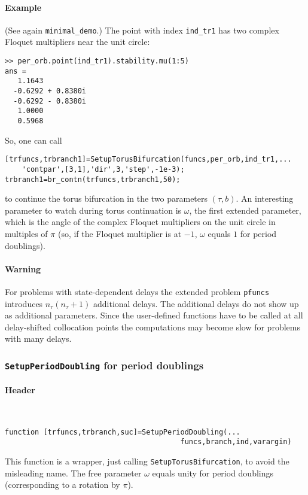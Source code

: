 \documentclass[11pt]{scrartcl}
\newcommand{\mlvar}[1]{\lstinline[keywordstyle=\color{var}]!#1!}
\newcommand{\blist}[1]{\mbox{\lstinline!#1!}}
\begin{document}
\paragraph{Example}
(See again \texttt{minimal\_demo}.) The point with index
\blist{ind_tr1} has two complex Floquet multipliers near the unit
circle: {\small
\begin{verbatim}
>> per_orb.point(ind_tr1).stability.mu(1:5)
ans =
   1.1643          
  -0.6292 + 0.8380i
  -0.6292 - 0.8380i
   1.0000          
   0.5968          
\end{verbatim}
} So, one can call
\begin{lstlisting}
[trfuncs,trbranch1]=SetupTorusBifurcation(funcs,per_orb,ind_tr1,...
    'contpar',[3,1],'dir',3,'step',-1e-3);
trbranch1=br_contn(trfuncs,trbranch1,50);
\end{lstlisting}
to continue the torus bifurcation in the two parameters $(\tau,b)$. An
interesting parameter to watch during torus continuation is $\omega$,
the first extended parameter, which is the angle of the complex
Floquet multipliers on the unit circle in multiples of $\pi$ (so, if
the Floquet multiplier is at $-1$, $\omega$ equals $1$ for period doublings).

\paragraph{Warning}
For problems with state-dependent delays the extended problem
\mlvar{pfuncs} introduces $n_\tau(n_\tau+1)$ additional delays. The
additional delays do not show up as additional parameters.  Since the
user-defined functions have to be called at all delay-shifted
collocation points the computations may become slow for problems with
many delays.

\subsubsection{\blist{SetupPeriodDoubling} for period doublings}
\label{sec:pd}
\paragraph{Header}\ 
\begin{lstlisting}
function [trfuncs,trbranch,suc]=SetupPeriodDoubling(...
                                         funcs,branch,ind,varargin)
\end{lstlisting}
This function is a wrapper, just calling
\blist{SetupTorusBifurcation}, to avoid the misleading name. The free
parameter $\omega$ equals unity for period doublings (corresponding to
a rotation by $\pi$).
\end{document}
